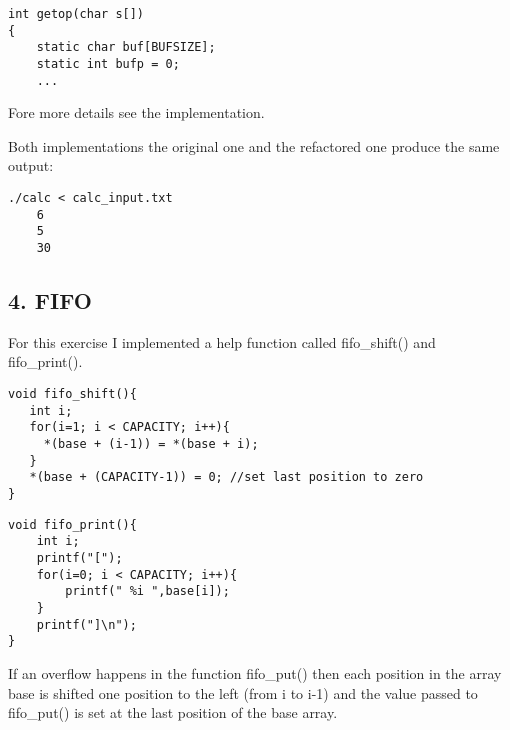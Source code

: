 \documentclass[12pt]{article}
\begin{document}
\begin{lstlisting}
int getop(char s[])
{
    static char buf[BUFSIZE];
    static int bufp = 0;
    ...
\end{lstlisting}

Fore more details see the implementation.

Both implementations the original one and the refactored one produce the same output:
\begin{lstlisting}
./calc < calc_input.txt 
	6
	5
	30
\end{lstlisting}

\subsection*{4. FIFO}
For this exercise I implemented a help function called fifo\_shift() and fifo\_print().

\begin{lstlisting}
void fifo_shift(){
   int i; 
   for(i=1; i < CAPACITY; i++){
     *(base + (i-1)) = *(base + i);
   }
   *(base + (CAPACITY-1)) = 0; //set last position to zero
}
\end{lstlisting} 

\begin{lstlisting}
void fifo_print(){
    int i;
    printf("["); 
    for(i=0; i < CAPACITY; i++){
        printf(" %i ",base[i]);  
    }
    printf("]\n");       
}
\end{lstlisting}

If an overflow happens in the function fifo\_put() then each position in the array base is shifted one position to the left (from i to i-1) and the value passed to fifo\_put() is set at the last position of the base array.
\end{document}
